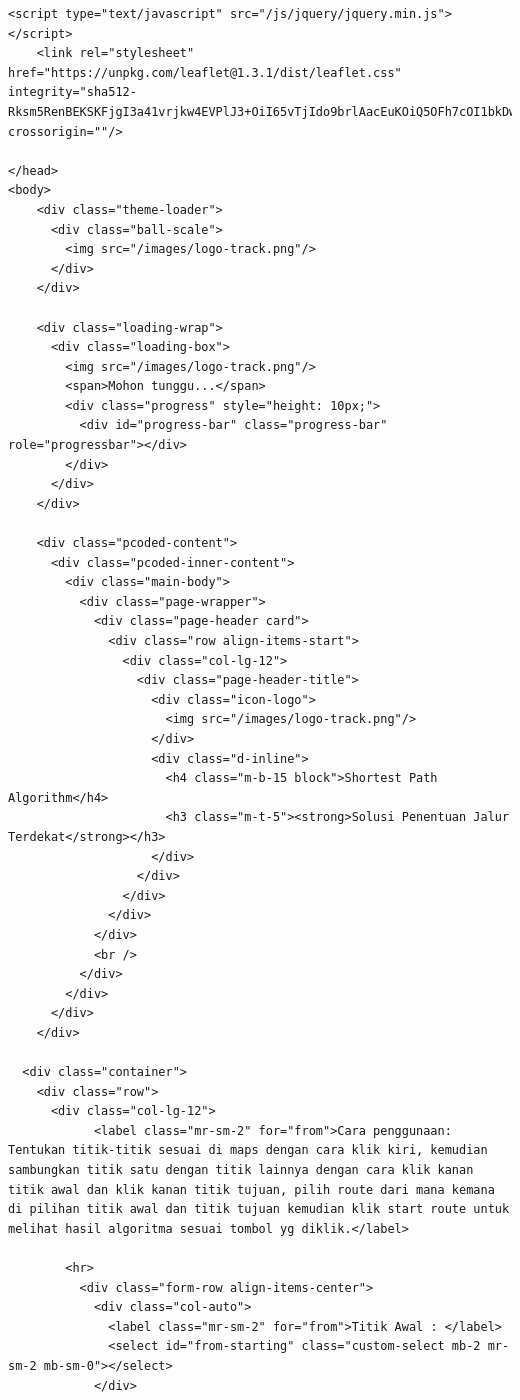 \begin{enumerate}
\begin{lstlisting}[caption=index.php Full Code]
    <script type="text/javascript" src="/js/jquery/jquery.min.js"></script>
    <link rel="stylesheet" href="https://unpkg.com/leaflet@1.3.1/dist/leaflet.css" integrity="sha512-Rksm5RenBEKSKFjgI3a41vrjkw4EVPlJ3+OiI65vTjIdo9brlAacEuKOiQ5OFh7cOI1bkDwLqdLw3Zg0cRJAAQ==" crossorigin=""/>

</head>
<body>
    <div class="theme-loader">
      <div class="ball-scale">
        <img src="/images/logo-track.png"/>
      </div>
    </div>

    <div class="loading-wrap">
      <div class="loading-box">
        <img src="/images/logo-track.png"/>
        <span>Mohon tunggu...</span>
        <div class="progress" style="height: 10px;">
          <div id="progress-bar" class="progress-bar" role="progressbar"></div>
        </div>
      </div>
    </div>

    <div class="pcoded-content">
      <div class="pcoded-inner-content">
        <div class="main-body">
          <div class="page-wrapper">
            <div class="page-header card">
              <div class="row align-items-start">
                <div class="col-lg-12">
                  <div class="page-header-title">
                    <div class="icon-logo">
                      <img src="/images/logo-track.png"/>
                    </div>
                    <div class="d-inline">
                      <h4 class="m-b-15 block">Shortest Path Algorithm</h4>
                      <h3 class="m-t-5"><strong>Solusi Penentuan Jalur Terdekat</strong></h3>
                    </div>
                  </div>
                </div>
              </div>
            </div>
            <br />
          </div>
        </div>
      </div>
    </div>

  <div class="container">
    <div class="row">
      <div class="col-lg-12">
            <label class="mr-sm-2" for="from">Cara penggunaan: Tentukan titik-titik sesuai di maps dengan cara klik kiri, kemudian sambungkan titik satu dengan titik lainnya dengan cara klik kanan titik awal dan klik kanan titik tujuan, pilih route dari mana kemana di pilihan titik awal dan titik tujuan kemudian klik start route untuk melihat hasil algoritma sesuai tombol yg diklik.</label>

        <hr>
          <div class="form-row align-items-center">
            <div class="col-auto">
              <label class="mr-sm-2" for="from">Titik Awal : </label>
              <select id="from-starting" class="custom-select mb-2 mr-sm-2 mb-sm-0"></select>
            </div>


\end{lstlisting}
\end{enumerate}
